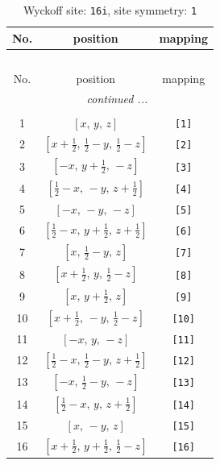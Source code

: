 \documentclass[fleqn,8pt]{jsarticle}
\begin{document}
\begin{longtable}{ccc}
\caption{Wyckoff site: {\tt 16i}, site symmetry: {\tt 1}}
 \\
 \hline \hline
No. & position & mapping \\ \hline \endfirsthead

\multicolumn{2}{l}{\tablename\ \thetable{}} \\
 \hline \hline
No. & position & mapping \\ \hline \endhead

 \hline \hline
\multicolumn{2}{r}{\footnotesize\it continued ...} \\ \endfoot

 \hline \hline
\multicolumn{2}{r}{} \\ \endlastfoot

1 & $\left[ x,\, y,\, z \right]$ & {\tt [1]} \\ \hline
2 & $\left[ x + \frac{1}{2},\, \frac{1}{2} - y,\, \frac{1}{2} - z \right]$ & {\tt [2]} \\ \hline
3 & $\left[ - x,\, y + \frac{1}{2},\, - z \right]$ & {\tt [3]} \\ \hline
4 & $\left[ \frac{1}{2} - x,\, - y,\, z + \frac{1}{2} \right]$ & {\tt [4]} \\ \hline
5 & $\left[ - x,\, - y,\, - z \right]$ & {\tt [5]} \\ \hline
6 & $\left[ \frac{1}{2} - x,\, y + \frac{1}{2},\, z + \frac{1}{2} \right]$ & {\tt [6]} \\ \hline
7 & $\left[ x,\, \frac{1}{2} - y,\, z \right]$ & {\tt [7]} \\ \hline
8 & $\left[ x + \frac{1}{2},\, y,\, \frac{1}{2} - z \right]$ & {\tt [8]} \\ \hline
9 & $\left[ x,\, y + \frac{1}{2},\, z \right]$ & {\tt [9]} \\ \hline
10 & $\left[ x + \frac{1}{2},\, - y,\, \frac{1}{2} - z \right]$ & {\tt [10]} \\ \hline
11 & $\left[ - x,\, y,\, - z \right]$ & {\tt [11]} \\ \hline
12 & $\left[ \frac{1}{2} - x,\, \frac{1}{2} - y,\, z + \frac{1}{2} \right]$ & {\tt [12]} \\ \hline
13 & $\left[ - x,\, \frac{1}{2} - y,\, - z \right]$ & {\tt [13]} \\ \hline
14 & $\left[ \frac{1}{2} - x,\, y,\, z + \frac{1}{2} \right]$ & {\tt [14]} \\ \hline
15 & $\left[ x,\, - y,\, z \right]$ & {\tt [15]} \\ \hline
16 & $\left[ x + \frac{1}{2},\, y + \frac{1}{2},\, \frac{1}{2} - z \right]$ & {\tt [16]} \\
\end{longtable}
\end{document}
